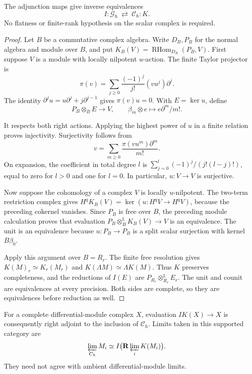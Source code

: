 \begin{theorem}\label{mht:thm:adic-normal-reconstruction}
The adjunction maps give inverse equivalences
\[
 I:\mathcal G_\hbar\ \rightleftarrows\
                       \mathcal C_\hbar:K.
\]
No flatness or finite-rank hypothesis on the scalar complex
is required.
\end{theorem}
\begin{proof}
Let $B$ be a commutative complex algebra. Write $D_B,P_B$
for the normal algebra and module over $B$, and put
$K_B(V)=\operatorname{RHom}_{D_B}(P_B,V)$.
First suppose $V$ is a module with locally nilpotent $u$-action.
The finite Taylor projector is
\[
 \pi(v)=\sum_{j\geq0}\frac{(-1)^j}{j!}(vu^j)\partial^j.
\]
The identity $\partial^ju=u\partial^j+j\partial^{j-1}$
gives $\pi(v)u=0$. With $E=\ker u$, define
\[
 P_B\otimes_B E\longrightarrow V,
 \qquad \beta_m\otimes e\longmapsto e\partial^m/m!.
\]

It respects both right actions. Applying the highest power
of $u$ in a finite relation proves injectivity.
Surjectivity follows from
\[
 v=\sum_{m\geq0}\frac{\pi(vu^m)\partial^m}{m!}.
\]
On expansion, the coefficient in total degree $l$ is
$\sum_{j=0}^l(-1)^j/(j!(l-j)!)$, equal to zero for $l>0$
and one for $l=0$. In particular, $u:V\to V$ is surjective.

Now suppose the cohomology of a complex $V$ is locally
$u$-nilpotent. The two-term restriction complex gives
$H^qK_B(V)=\ker(u:H^qV\to H^qV)$, because the preceding
cokernel vanishes. Since $P_B$ is free over $B$, the
preceding module calculation proves that evaluation
$P_B\otimes_B^{\mathbb L}K_B(V)\to V$ is an equivalence.
The unit is an equivalence because $u:P_B\to P_B$ is a
split scalar surjection with kernel $B\beta_0$.

Apply this argument over $B=R_r$. The finite free resolution
gives $K(M)_r\simeq K_r(M_r)$ and
$K(\Lambda M)\simeq\Lambda K(M)$.
Thus $K$ preserves completeness, and the reductions of
$I(E)$ are $P_{R_r}\otimes_{R_r}^{\mathbb L}E_r$.
The unit and counit are equivalences at every precision.
Both sides are complete, so they are equivalences before
reduction as well.
\end{proof}

For a complete differential-module complex $X$, evaluation
$IK(X)\to X$ is consequently right adjoint to the inclusion
of $\mathcal C_\hbar$. Limits taken in this supported
category are
\[
 \varprojlim_{\mathcal C_\hbar}M_i
       \simeq I\bigl(\mathbf R\varprojlim_i K(M_i)\bigr).
\]
They need not agree with ambient differential-module limits.

